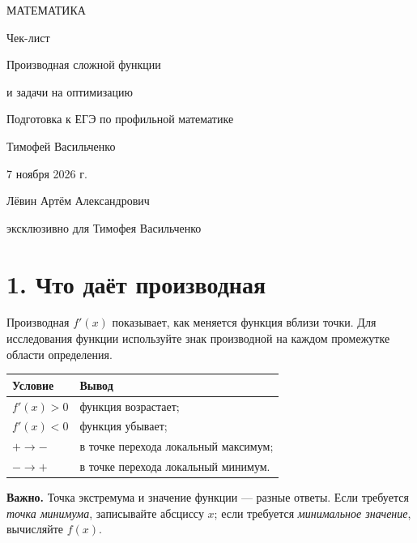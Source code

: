 \documentclass[a4paper,12pt]{article}
\newcommand{\sect}[1]{\section*{\textcolor{darkaccent}{#1}}}
\newcommand{\note}[1]{\textcolor{darkaccent}{\textbf{Важно.}} #1}
\begin{document}
\thispagestyle{empty}
\begin{center}
\vspace*{24mm}
{\large\textcolor{darkaccent}{МАТЕМАТИКА}}\par
\vspace{13mm}
{\LARGE Чек-лист}\par
\vspace{13mm}
{\Large\textcolor{accent}{Производная сложной функции}}\par
{\Large\textcolor{accent}{и задачи на оптимизацию}}\par
\vspace{17mm}
{\normalsize Подготовка к ЕГЭ по профильной математике}\par
\vfill
{\large Тимофей Васильченко}\par
\vspace{10mm}
{7 ноября 2026 г.}\par
\vspace{16mm}
{\small Лёвин Артём Александрович}\par
{\small эксклюзивно для Тимофея Васильченко}\par
\vspace{21mm}
\end{center}
\clearpage

\sect{1. Что даёт производная}
Производная \(f'(x)\) показывает, как меняется функция вблизи точки. Для исследования функции используйте знак производной на каждом промежутке области определения.
\begin{center}
\begin{tabularx}{.94\linewidth}{@{}>{\bfseries}l X@{}}
\toprule
Условие & Вывод \\
\midrule
\(f'(x)>0\) & функция возрастает; \\
\(f'(x)<0\) & функция убывает; \\
\( +\to-\) & в точке перехода локальный максимум; \\
\( -\to+\) & в точке перехода локальный минимум. \\
\bottomrule
\end{tabularx}
\end{center}
\note{Точка экстремума и значение функции --- разные ответы.} Если требуется \emph{точка минимума}, записывайте абсциссу \(x\); если требуется \emph{минимальное значение}, вычисляйте \(f(x)\).
\end{document}

